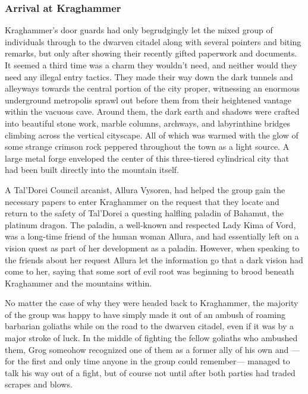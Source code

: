 \setlength{\parindent}{4em}
\setlength{\parskip}{0.5em}
\renewcommand{\baselinestretch}{1.0}

\subsubsection{Arrival at Kraghammer}

\hfill %

\huge \textsc{K}\normalsize raghammer's door guards had only begrudgingly let the mixed group of individuals through to the dwarven citadel along with several pointers and biting remarks, but only after showing their recently gifted paperwork and documents. It seemed a third time was a charm they wouldn't need, and neither would they need any illegal entry tactics. They made their way down the dark tunnels and alleyways towards the central portion of the city proper, witnessing an enormous underground metropolis sprawl out before them from their heightened vantage within the vacuous cave. Around them, the dark earth and shadows were crafted into beautiful stone work, marble columns, archways, and labyrinthine bridges climbing across the vertical cityscape. All of which was warmed with the glow of some strange crimson rock peppered throughout the town as a light source. A large metal forge enveloped the center of this three-tiered cylindrical city that had been built directly into the mountain itself.

A Tal'Dorei Council arcanist, Allura Vysoren, had helped the group gain the necessary papers to enter Kraghammer on the request that they locate and return to the safety of Tal'Dorei a questing halfling paladin of Bahamut, the platinum dragon. The paladin, a well-known and respected Lady Kima of Vord, was a long-time friend of the human woman Allura, and had essentially left on a vision quest as part of her development as a paladin. However, when speaking to the friends about her request Allura let the information go that a dark vision had come to her, saying that some sort of evil root was beginning to brood beneath Kraghammer and the mountains within. 

No matter the case of why they were headed back to Kraghammer, the majority of the group was happy to have simply made it out of an ambush of roaming barbarian goliaths while on the road to the dwarven citadel, even if it was by a major stroke of luck. In the middle of fighting the fellow goliaths who ambushed them, Grog someohow recognized one of them as a former ally of his own and ---for the first and only time anyone in the group could remember--- managed to talk his way out of a fight, but of course not until after both parties had traded scrapes and blows.

